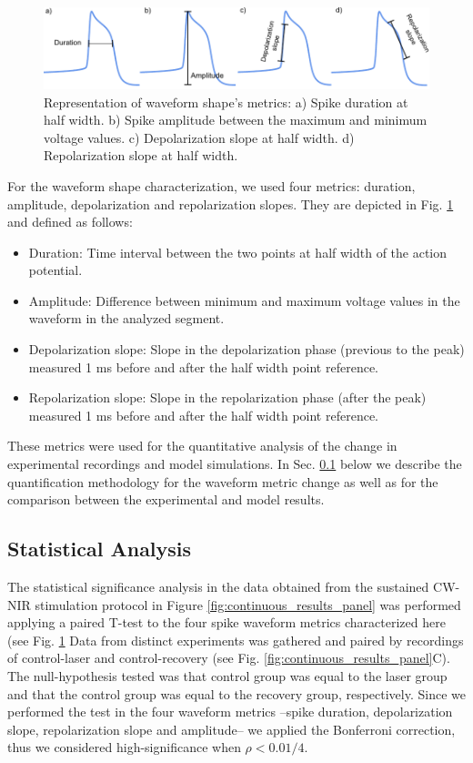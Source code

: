 \begin{figure}[htb!]
	\includegraphics[width=\textwidth]{img/laser/spike_metrics.pdf}
	\caption{Representation of waveform shape's metrics: a) Spike duration at half width. b) Spike amplitude between the maximum and minimum voltage values. c) Depolarization slope at half width. d) Repolarization slope at half width.}
	\label{fig:spike metrics}
\end{figure}


For the waveform shape characterization, we used four metrics: duration, amplitude, depolarization and repolarization slopes. They are depicted in Fig. \ref{fig:spike metrics} and defined as follows:
\begin{itemize}
	\item Duration: Time interval between the two points at half width of the action potential. 
	\item Amplitude: Difference between minimum and maximum voltage values in the waveform in the analyzed segment. 
	\item Depolarization slope: Slope in the depolarization phase (previous to the peak) measured 1 ms before and after the half width point reference.
	\item Repolarization slope: Slope in the repolarization phase (after the peak) measured 1 ms before and after the half width point reference.
\end{itemize}

These metrics were used for the quantitative analysis of the change in experimental recordings and model simulations. In Sec. \ref{sect:statistical_analysis} below we describe the quantification methodology for the waveform metric change as well as for the comparison between the experimental and model results.



\subsection{Statistical Analysis}
\label{sect:statistical_analysis}
The statistical significance analysis in the data obtained from the sustained CW-NIR stimulation protocol in Figure \ref{fig:continuous_results_panel} was performed applying a paired T-test to the four spike waveform metrics characterized here (see Fig. \ref{fig:spike metrics} Data from distinct experiments was gathered and paired by recordings of control-laser and control-recovery (see Fig. \ref{fig:continuous_results_panel}C). The null-hypothesis tested was that control group was equal to the laser group and that the control group was equal to the recovery group, respectively. Since we performed the test in the four waveform metrics --spike duration, depolarization slope, repolarization slope and amplitude-- we applied the Bonferroni correction, thus we considered high-significance when $\rho < 0.01/4$.

